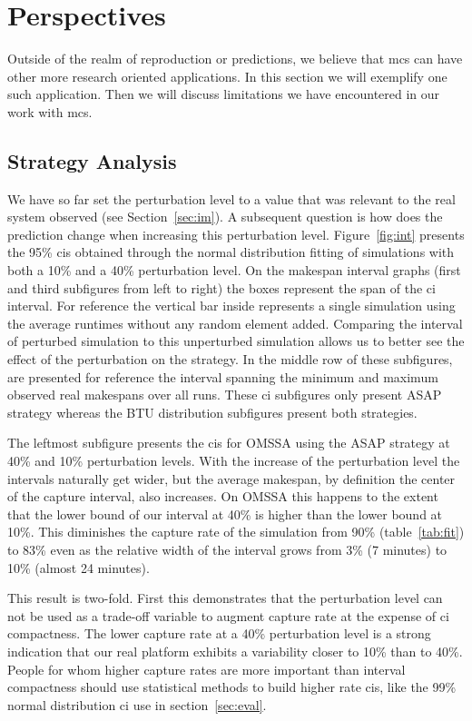 \documentclass[10pt,conference,compsocconf]{IEEEtran}
\begin{document}
\section{Perspectives}
\label{sec:disc}
Outside of the realm of reproduction or predictions, we believe that \ac{mcs}
can have other more research oriented applications. In this section we will
exemplify one such application. Then we will discuss limitations we have
encountered in our work with \ac{mcs}.

\subsection{Strategy Analysis}\label{sec:sa}

We have so  far set the perturbation level  to a value that was  relevant to the
real system observed  (see Section~\ref{sec:im}).  A subsequent  question is how
does   the  prediction   change   when  increasing   this  perturbation   level.
Figure~\ref{fig:int} presents the 95\% \acp{ci} obtained through the normal
distribution fitting of simulations with both a 10\%
and a 40\% perturbation  level. On the makespan interval graphs  (first and third
subfigures  from left  to right)  the boxes  represent the  span of the \ac{ci}
interval. For reference  the vertical bar inside represents  a single simulation
using  the average  runtimes without  any random  element added.   Comparing the
interval of  perturbed simulation  to this unperturbed  simulation allows  us to
better see  the effect of the perturbation on the strategy. In the middle row of
these subfigures, are presented for  reference the interval spanning the minimum
and maximum  observed real  makespans over all  runs.  These  \ac{ci} subfigures
only present ASAP strategy whereas  the BTU distribution subfigures present both
strategies.

The leftmost subfigure presents the \acp{ci} for OMSSA using the ASAP strategy at
40\% and 10\% perturbation levels. With the increase of the perturbation level
the intervals naturally get wider, but the average makespan, by definition the
center of the capture interval, also increases. On OMSSA this happens to the
extent that the lower bound of our interval at 40\% is higher than the lower
bound at 10\%. This diminishes the capture rate of the simulation from 90\%
(table~\ref{tab:fit}) to 83\% even as the relative width of the interval grows
from 3\% (7 minutes) to 10\% (almost 24 minutes).

This result is two-fold. First this demonstrates that the perturbation level can
not be used as a trade-off variable to augment capture rate at the expense of
\ac{ci} compactness. The lower capture rate at a 40\% perturbation level is a
strong indication that our real platform exhibits a variability closer to
10\% than to 40\%. People for whom higher capture rates are more important than
interval compactness should use statistical methods to build higher rate \acp{ci},
like the 99\% normal distribution \ac{ci} use in section~\ref{sec:eval}.
\end{document}
